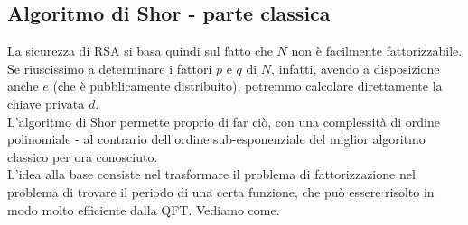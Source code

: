 \documentclass[../../InformazioneQuantistica.tex]{subfiles}
\begin{document}
\subsection{Algoritmo di Shor - parte classica}
La sicurezza di RSA si basa quindi sul fatto che $N$ non è facilmente fattorizzabile. Se riuscissimo a determinare i fattori $p$ e $q$ di $N$, infatti, avendo a disposizione anche $e$ (che è pubblicamente distribuito), potremmo calcolare direttamente la chiave privata $d$.\\

L'algoritmo di Shor permette proprio di far ciò, con una complessità di ordine polinomiale - al contrario dell'ordine sub-esponenziale del miglior algoritmo classico per ora conosciuto.\\
L'idea alla base consiste nel trasformare il problema di fattorizzazione nel problema di trovare il periodo di una certa funzione, che può essere risolto in modo molto efficiente dalla QFT. Vediamo come.\\
\end{document}
